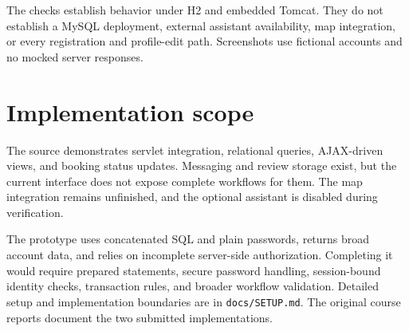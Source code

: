 \documentclass[10pt,a4paper]{article}
\begin{document}
The checks establish behavior under H2 and embedded Tomcat. They do not establish a MySQL deployment, external assistant availability, map integration, or every registration and profile-edit path. Screenshots use fictional accounts and no mocked server responses.

\section*{Implementation scope}
The source demonstrates servlet integration, relational queries, AJAX-driven views, and booking status updates. Messaging and review storage exist, but the current interface does not expose complete workflows for them. The map integration remains unfinished, and the optional assistant is disabled during verification.

The prototype uses concatenated SQL and plain passwords, returns broad account data, and relies on incomplete server-side authorization. Completing it would require prepared statements, secure password handling, session-bound identity checks, transaction rules, and broader workflow validation. Detailed setup and implementation boundaries are in \texttt{docs/SETUP.md}. The original course reports document the two submitted implementations.
\end{document}
